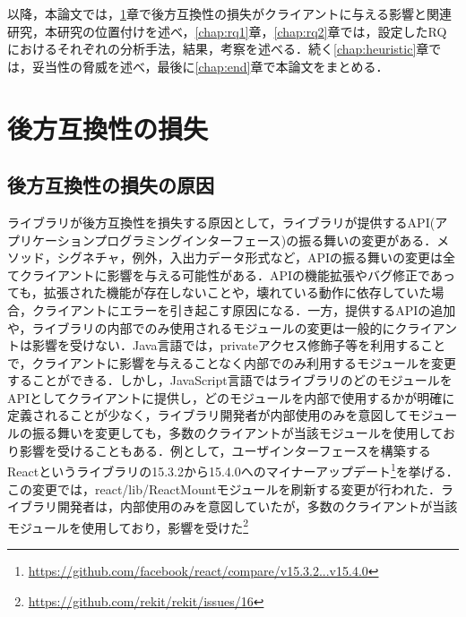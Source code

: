 \documentclass[11pt,dvipdfmx]{jreport}
\begin{document}
以降，本論文では，\ref{chap:backward-compatibility}章で後方互換性の損失がクライアントに与える影響と関連研究，本研究の位置付けを述べ，\ref{chap:rq1}章，\ref{chap:rq2}章では，設定したRQにおけるそれぞれの分析手法，結果，考察を述べる．続く\ref{chap:heuristic}章では，妥当性の脅威を述べ，最後に\ref{chap:end}章で本論文をまとめる．

\chapter{後方互換性の損失}\label{chap:backward-compatibility}

\section{後方互換性の損失の原因}
ライブラリが後方互換性を損失する原因として，ライブラリが提供するAPI(アプリケーションプログラミングインターフェース)の振る舞いの変更がある．メソッド，シグネチャ，例外，入出力データ形式など，APIの振る舞いの変更は全てクライアントに影響を与える可能性がある．APIの機能拡張やバグ修正であっても，拡張された機能が存在しないことや，壊れている動作に依存していた場合，クライアントにエラーを引き起こす原因になる．一方，提供するAPIの追加や，ライブラリの内部でのみ使用されるモジュールの変更は一般的にクライアントは影響を受けない．Java言語では，privateアクセス修飾子等を利用することで，クライアントに影響を与えることなく内部でのみ利用するモジュールを変更することができる．しかし，JavaScript言語ではライブラリのどのモジュールをAPIとしてクライアントに提供し，どのモジュールを内部で使用するかが明確に定義されることが少なく，ライブラリ開発者が内部使用のみを意図してモジュールの振る舞いを変更しても，多数のクライアントが当該モジュールを使用しており影響を受けることもある．例として，ユーザインターフェースを構築するReactというライブラリの15.3.2から15.4.0へのマイナーアップデート\footnote{\url{https://github.com/facebook/react/compare/v15.3.2...v15.4.0}}を挙げる．この変更では，react/lib/ReactMountモジュールを刷新する変更が行われた．ライブラリ開発者は，内部使用のみを意図していたが，多数のクライアントが当該モジュールを使用しており，影響を受けた\footnote{\url{https://github.com/rekit/rekit/issues/16}}
\end{document}
